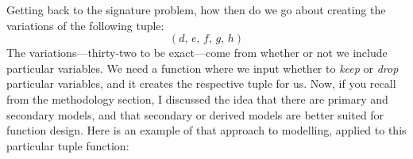 \documentclass[twoside]{article}
\begin{document}
Getting back to the signature problem, how then do we go about creating the variations of the following tuple:
$$ (d,\, e,\, f,\, g,\, h) $$
The variations---thirty-two to be exact---come from whether or not we include particular variables. We need a function
where we input whether to \emph{keep} or \emph{drop} particular variables, and it creates the respective tuple for us.
Now, if you recall from the methodology section, I discussed the idea that there are primary and secondary models,
and that secondary or derived models are better suited for function design. Here is an example of that approach
to modelling, applied to this particular tuple function:

\end{document}
